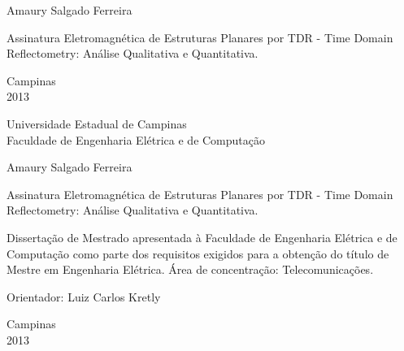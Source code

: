 \vspace*{2.0cm}
\begin{center}
\large Amaury Salgado Ferreira
\end{center}


\vspace*{6.8cm}

\begin{center}
{\sc \Large  Assinatura Eletromagnética de Estruturas Planares por TDR - Time Domain Reflectometry: Análise Qualitativa e Quantitativa.}
\end{center}

\vspace*{3.25cm}


\null \vfill

\begin{center}
Campinas\\2013
\end{center}
\newpage

\begin{center}
\large Universidade Estadual de Campinas\\
Faculdade de Engenharia Elétrica e de Computação
\end{center}

\vspace*{1.5cm}
\begin{center}
\large Amaury Salgado Ferreira
\end{center}


\vspace*{2.3cm}

\begin{center}
{\sc  Assinatura Eletromagnética de Estruturas Planares por TDR - Time Domain Reflectometry: Análise Qualitativa e Quantitativa.}
\end{center}

\vspace*{3.0cm}

\begin{flushright}
\begin{minipage}{9.0cm}
Dissertação de Mestrado apresentada à Faculdade de Engenharia Elétrica e de Computação como  parte dos
requisitos exigidos para a obtenção do título de Mestre em Engenharia Elétrica. Área de
concentração: Telecomunicações. 

\vspace*{0.5cm}
Orientador: Luiz Carlos Kretly

\end{minipage}
\end{flushright}

\null \vfill


\vspace*{0.5cm}

\begin{center}
Campinas\\2013
\end{center}
